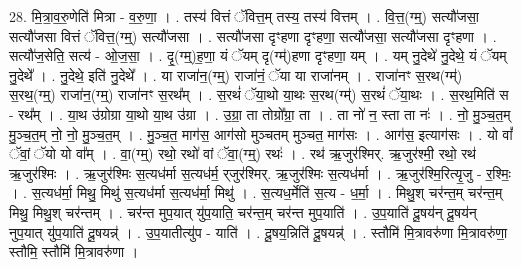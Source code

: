 \documentclass[17pt]{extarticle}
\begin{document}
28. मि॒त्रा॒व॒रु॒णेति॑ मित्रा - व॒रु॒णा॒ । . तस्य॑ वित्तं ॅवित्त॒म् तस्य॒ तस्य॑ वित्तम् । . वि॒त्त॒(ग्म्॒) सत्यौ॑जसा॒ सत्यौ॑जसा वित्तं ॅवित्त॒(ग्म्॒) सत्यौ॑जसा । . सत्यौ॑जसा दृꣳहणा दृꣳहणा॒ सत्यौ॑जसा॒ सत्यौ॑जसा दृꣳहणा । . सत्यौ॑ज॒सेति॒ सत्य॑ - ओ॒ज॒सा॒ । . दृ॒(ग्म्॒)ह॒णा॒ यं ॅयम् दृ(ग्म्॑)हणा दृꣳहणा॒ यम् । . यम् नु॒देथे॑ नु॒देथे॒ यं ॅयम् नु॒देथे᳚ । . नु॒देथे॒ इति॑ नु॒देथे᳚ । . या राजा॑न॒(ग्म्॒) राजा॑नं॒ ॅया या राजा॑नम् । . राजा॑नꣳ स॒रथ(ग्म्॑) स॒रथ॒(ग्म्॒) राजा॑न॒(ग्म्॒) राजा॑नꣳ स॒रथ᳚म् । . स॒रथं॑ ॅया॒थो या॒थः स॒रथ(ग्म्॑) स॒रथं॑ ॅया॒थः । . स॒रथ॒मिति॑ स - रथ᳚म् । . या॒थ उ॑ग्रोग्रा या॒थो या॒थ उ॑ग्रा । . उ॒ग्रा॒ ता तोग्रो᳚ग्रा॒ ता । . ता नो॑ न॒ स्ता ता नः॑ । . नो॒ मु॒ञ्च॒त॒म् मु॒ञ्च॒त॒म् नो॒ नो॒ मु॒ञ्च॒त॒म् । . मु॒ञ्च॒त॒ माग॑स॒ आग॑सो मुञ्चतम् मुञ्चत॒ माग॑सः । . आग॑स॒ इत्याग॑सः । . यो वां᳚ ॅवां॒ ॅयो यो वा᳚म् । . वा॒(ग्म्॒) रथो॒ रथो॑ वां ॅवा॒(ग्म्॒) रथः॑ । . रथ॑ ऋ॒जुर॑श्मिर्. ऋ॒जुर॑श्मी॒ रथो॒ रथ॑ ऋ॒जुर॑श्मिः । . ऋ॒जुर॑श्मिः स॒त्यध॑र्मा स॒त्यध॑र्म॒ र्‌जुर॑श्मिर्. ऋ॒जुर॑श्मिः स॒त्यध॑र्मा । . ऋ॒जुर॑श्मि॒रित्यृ॒जु - र॒श्मिः॒ । . स॒त्यध॑र्मा॒ मिथु॒ मिथु॑ स॒त्यध॑र्मा स॒त्यध॑र्मा॒ मिथु॑ । . स॒त्यध॒र्मेति॑ स॒त्य - ध॒र्मा॒ । . मिथु॒श् चर॑न्त॒म् चर॑न्त॒म् मिथु॒ मिथु॒श् चर॑न्तम् । . चर॑न्त मुप॒यात् यु॑प॒याति॒ चर॑न्त॒म् चर॑न्त मुप॒याति॑ । . उ॒प॒याति॑ दू॒षय॑न् दू॒षय॑न् नुप॒यात् यु॑प॒याति॑ दू॒षयन्न्॑ । . उ॒प॒यातीत्यु॑प - याति॑ । . दू॒षय॒न्निति॑ दू॒षयन्न्॑ । . स्तौमि॑ मि॒त्रावरु॑णा मि॒त्रावरु॑णा॒ स्तौमि॒ स्तौमि॑ मि॒त्रावरु॑णा । \newline
\end{document}
